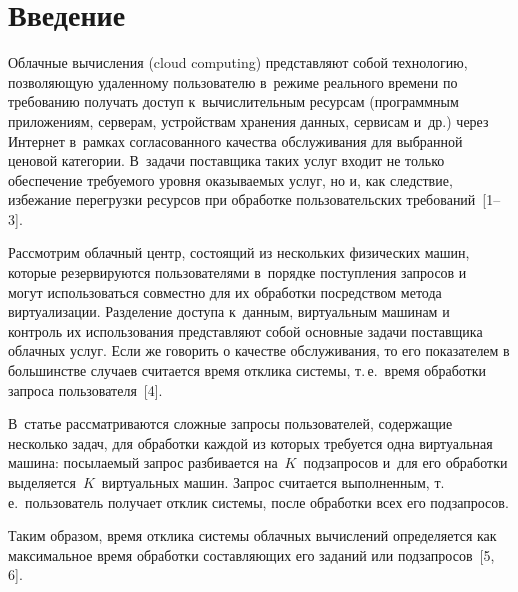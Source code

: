 



\thispagestyle{headings}

\begin{multicols}{2}

\label{st\stat}

\section{Введение}

  Облачные вычисления (cloud computing) представляют собой технологию, 
позволяющую удаленному пользователю в~режиме реального времени по 
требованию получать доступ к~вычислительным ресурсам (программным 
приложениям, серверам, устройствам хранения данных, сервисам и~др.) через 
Интернет в~рамках согласованного качества обслуживания для выбранной 
ценовой категории. В~задачи поставщика таких услуг входит не только 
обеспечение требуемого уровня оказываемых услуг, но и, как следствие, 
избежание перегрузки ресурсов при обработке пользовательских 
требований~[1--3].
  
  Рассмотрим облачный центр, состоящий из нескольких физических машин, 
которые резервируются пользователями в~порядке поступления запросов и~
могут использоваться совместно для их обработки посредством метода 
виртуализации. Разделение доступа к~данным, виртуальным машинам и~
контроль их использования представляют собой основные задачи поставщика 
облачных услуг. Если же говорить о качестве обслуживания, то его показателем 
в большинстве случаев считается время отклика системы, т.\,е.\ время 
обработки запроса пользователя~[4]. 

В~статье рассматриваются сложные 
запросы пользователей, содержащие несколько задач, для обработки каждой из 
которых требуется одна виртуальная машина: посылаемый запрос разбивается 
на~$K$~подзапросов и~для его обработки выделяется~$K$~виртуальных 
машин. Запрос считается выполненным, т.\,е.\ пользователь получает отклик 
системы, после обработки всех его подзапросов. 

Таким образом, время отклика 
системы облачных вычислений определяется как максимальное время 
обработки составляющих его заданий или подзапросов~[5, 6].
  

\end{multicols}
